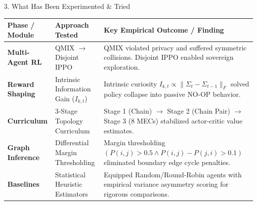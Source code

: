 \documentclass[aspectratio=169, 10pt]{beamer}
\begin{document}
\begin{frame}{3. What Has Been Experimented \& Tried}
  \begin{table}
    \centering
    \small
    \begin{tabular}{llp{7cm}}
      \toprule
      \textbf{Phase / Module} & \textbf{Approach Tested} & \textbf{Key Empirical Outcome / Finding} \\
      \midrule
      \textbf{Multi-Agent RL} & QMIX $\to$ Disjoint IPPO & QMIX violated privacy and suffered symmetric collisions. Disjoint IPPO enabled sovereign exploration. \\
      \midrule
      \textbf{Reward Shaping} & Intrinsic Information Gain ($I_{k,t}$) & Intrinsic curiosity $I_{k,t} \propto \|\Sigma_t - \Sigma_{t-1}\|_F$ solved policy collapse into passive NO-OP behavior. \\
      \midrule
      \textbf{Curriculum} & 3-Stage Topology Curriculum & Stage 1 (Chain) $\to$ Stage 2 (Chain Pair) $\to$ Stage 3 (8 MECs) stabilized actor-critic value estimates. \\
      \midrule
      \textbf{Graph Inference} & Differential Margin Thresholding & Margin thresholding $(P(i,j) > 0.5 \land P(i,j)-P(j,i) > 0.1)$ eliminated boundary edge cycle penalties. \\
      \midrule
      \textbf{Baselines} & Statistical Heuristic Estimators & Equipped Random/Round-Robin agents with empirical variance asymmetry scoring for rigorous comparisons. \\
      \bottomrule
    \end{tabular}
  \end{table}
\end{frame}
\end{document}
